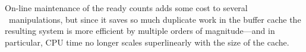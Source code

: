 On-line maintenance of the ready counts adds some cost to several \patch\
manipulations, but since it saves so much duplicate work in the buffer
cache the resulting system is more efficient by multiple orders of
magnitude---and in particular, CPU time no longer scales superlinearly with
the size of the cache.


\begin{comment}
For a \module\ like the write-back cache to forward \patches\ in a
dependency-preserving order, the \module\ must find \patches\ whose \befores\
are all ``closer to the disk'' (or are also being forwarded as part of the same
block write). We say that such \patches\ are \emph{ready}. 


Each \patch\ has a count of the number of \befores\ it has at block device
modules just as close to the disk as it currently is, and a count of the number
of \befores\ it has which are in flight. When these counts are both zero, it is
ready. A \patch's \before\ counts are incrementally updated as \befores\ are
added and removed and as \beforing\ \patches\ are moved closer to the disk.

Because \Kudos\ makes sure that the \befores\ of a \patch\ are at least as
close to the disk as it is, only directly reachable \beforing\ \patches\ need to
be included in a \patch's \before\ counts. \Noop\ \patches, with the exception
of managed \noop\ \patches\ (which have an explicit owning block device), add a
wrinkle to this simplifying rule, however. They are considered to be as close to
the disk as their \before\ which is the farthest from the disk, in effect,
propagating the distance to the disk metric through them.

When a \before\ count update changes whether a \patch\ is ready to write, the
\patch's inclusion in its block's ready list is updated. To write a block, a
\module\ thus iterates through the block's ready list, sending \patches\ to the
target block device, until the list is empty. Thus instead of having to
repeatedly traverse \patch\ graphs to determine readiness on demand, we have
this information maintained automatically as it changes. This automatic
maintenance adds some cost to forwarding \patches\ and changing the graph
structure, but since it saves so much duplicate work\footnote{The amount of
duplicate work saved is actually superlinear in the size of the write-back
cache.} it is much more efficient.
\end{comment}
